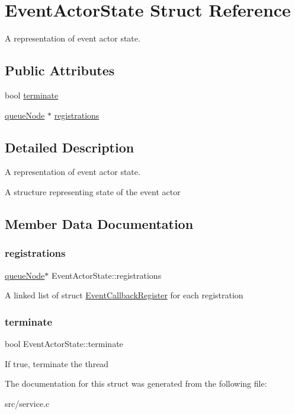 \hypertarget{structEventActorState}{}\section{Event\+Actor\+State Struct Reference}
\label{structEventActorState}


A representation of event actor state.  


\subsection*{Public Attributes}
\begin{DoxyCompactItemize}
\item 
bool \hyperlink{structEventActorState_a67caad153d6fcae5d611eb53a3bcd0c1}{terminate}
\item 
\hyperlink{queue_8h_ae1857eedcea35e26ec2c78b7b122b095}{queue\+Node} $\ast$ \hyperlink{structEventActorState_af6212af5126999825b7a04b6cf347164}{registrations}
\end{DoxyCompactItemize}


\subsection{Detailed Description}
A representation of event actor state. 

A structure representing state of the event actor 

\subsection{Member Data Documentation}
\mbox{\label{structEventActorState_af6212af5126999825b7a04b6cf347164}} 
\subsubsection{\texorpdfstring{registrations}{registrations}}
{\footnotesize\ttfamily \hyperlink{queue_8h_ae1857eedcea35e26ec2c78b7b122b095}{queue\+Node}$\ast$ Event\+Actor\+State\+::registrations}

A linked list of struct \hyperlink{structEventCallbackRegister}{Event\+Callback\+Register} for each registration \mbox{\label{structEventActorState_a67caad153d6fcae5d611eb53a3bcd0c1}} 
\subsubsection{\texorpdfstring{terminate}{terminate}}
{\footnotesize\ttfamily bool Event\+Actor\+State\+::terminate}

If true, terminate the thread 

The documentation for this struct was generated from the following file\+:\begin{DoxyCompactItemize}
\item 
src/service.\+c\end{DoxyCompactItemize}
